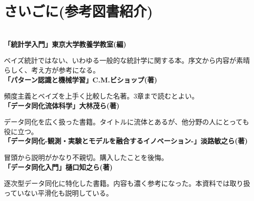 \documentclass[dvipdfmx, 9pt, a4paper]{jsarticle}
\begin{document}
\section*{さいごに(参考図書紹介)}
~\\
{\bf 「統計学入門」東京大学教養学教室(編)}\par
ベイズ統計ではない、いわゆる一般的な統計学に関する本。序文から内容が素晴らしく、考え方が参考になる。\\
{\bf 「パターン認識と機械学習」C.M.ビショップ(著)}\par
頻度主義とベイズを上手く比較した名著。3章まで読むとよい。\\
{\bf 「データ同化流体科学」大林茂ら(著)}\par
データ同化を広く扱った書籍。タイトルに流体とあるが、他分野の人にとっても役に立つ。\\
{\bf 「データ同化-観測・実験とモデルを融合するイノベーション-」淡路敏之ら(著)}\par
冒頭から説明がかなり不親切。購入したことを後悔。\\
{\bf 「データ同化入門」樋口知之ら(著)}\par
逐次型データ同化に特化した書籍。内容も濃く参考になった。本資料では取り扱っていない平滑化も説明している。
\end{document}
